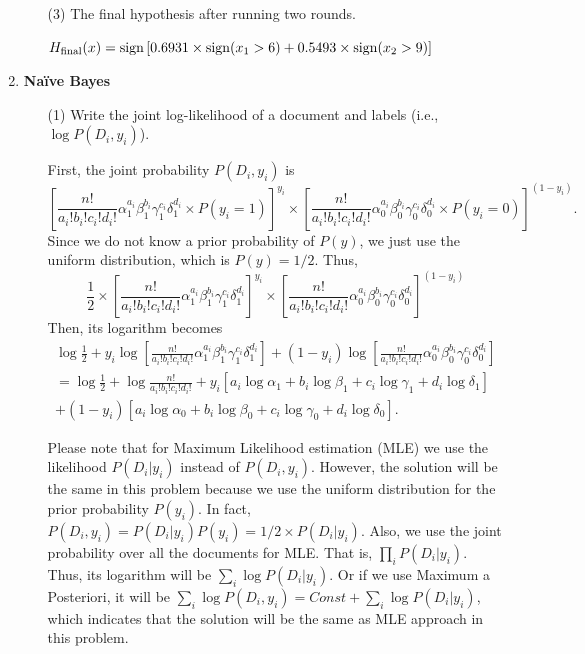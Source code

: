 \begin{enumerate}
\begin{enumerate}
\item[(3)] The final hypothesis after running two rounds.

$H_{\rm final}(x)={\rm sign} \left[ 0.6931 \times {\rm sign}(x_1 > 6) + 0.5493 \times {\rm sign}(x_2 > 9) \right]$

\end{enumerate}

\item {\bf Na\"ive Bayes}

\begin{enumerate}
\item[(1)] Write the joint log-likelihood of a document and labels (i.e., $\log P(D_i, y_i)$).

First, the joint probability $P(D_i, y_i)$ is
\[
\left[ \frac{n!}{a_i!b_i!c_i!d_i!}\alpha_1^{a_i}\beta_1^{b_i}\gamma_1^{c_i}\delta_1^{d_i} \times P(y_i=1)\right]^{y_i} \times \left[ \frac{n!}{a_i!b_i!c_i!d_i!}\alpha_0^{a_i}\beta_0^{b_i}\gamma_0^{c_i}\delta_0^{d_i} \times P(y_i=0)\right]^{(1-y_i)} .
\]
Since we do not know a prior probability of $P(y)$, we just use the uniform distribution, which is $P(y)=1/2$. Thus,
\[
\frac{1}{2} \times \left[ \frac{n!}{a_i!b_i!c_i!d_i!}\alpha_1^{a_i}\beta_1^{b_i}\gamma_1^{c_i}\delta_1^{d_i}\right]^{y_i} \times \left[ \frac{n!}{a_i!b_i!c_i!d_i!}\alpha_0^{a_i}\beta_0^{b_i}\gamma_0^{c_i}\delta_0^{d_i}\right]^{(1-y_i)}
\]
Then, its logarithm becomes
\begin{eqnarray}
\log \frac{1}{2} + y_i \log \left[ \frac{n!}{a_i!b_i!c_i!d_i!}\alpha_1^{a_i}\beta_1^{b_i}\gamma_1^{c_i}\delta_1^{d_i}\right] + (1-y_i) \log \left[ \frac{n!}{a_i!b_i!c_i!d_i!}\alpha_0^{a_i}\beta_0^{b_i}\gamma_0^{c_i}\delta_0^{d_i}\right]
 \nonumber \\
= \log \frac{1}{2} + \log \frac{n!}{a_i!b_i!c_i!d_i!} + y_i \left[ a_i \log \alpha_1 + b_i \log \beta_1 + c_i \log \gamma_1 + d_i \log \delta_1 \right] \nonumber \\ + (1-y_i) \left[ a_i \log \alpha_0 + b_i \log \beta_0 + c_i \log \gamma_0 + d_i \log \delta_0 \right] . \nonumber
\end{eqnarray}

Please note that for Maximum Likelihood estimation (MLE) we use the likelihood $P(D_i|y_i)$ instead of $P(D_i, y_i)$. However, the solution will be the same in this problem because we use the uniform distribution for the prior probability $P(y_i)$. In fact, $P(D_i,y_i)=P(D_i|y_i)P(y_i)=1/2 \times P(D_i|y_i)$. Also, we use the joint probability over all the documents for MLE. That is, $\prod_i P(D_i | y_i)$. Thus, its logarithm will be $\sum_i \log P(D_i |y_i)$. Or if we use Maximum a Posteriori, it will be $\sum_i \log P(D_i,y_i) = Const + \sum_i \log P(D_i|y_i)$, which indicates that the solution will be the same as MLE approach in this problem.


\end{enumerate}
\end{enumerate}
